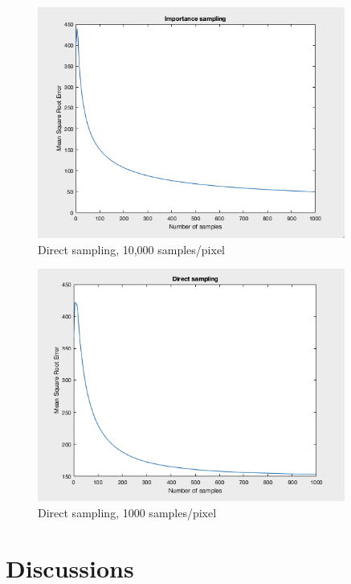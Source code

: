 \documentclass[10pt]{beamer}
\begin{document}
\begin{frame}
	\begin{figure}[H]
  \centering
    \includegraphics[width=0.9\textwidth]{importance_sampling.png}
    \caption{Direct sampling, 10,000 samples/pixel}
\end{figure}
\end{frame}

\begin{frame}
	\begin{figure}[H]
  \centering
    \includegraphics[width=0.9\textwidth]{direct_sampling.png}
    \caption{Direct sampling, 1000 samples/pixel}
\end{figure}
\end{frame}

\section{Discussions}
\end{document}
